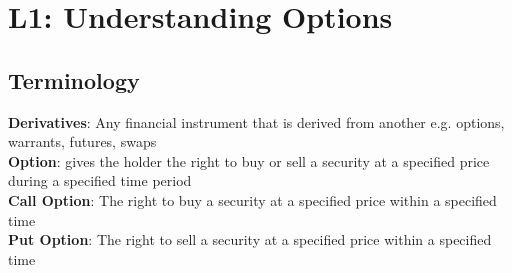 \documentclass{cheatsheet}
\author{ehaller, seyohnp}
\begin{document}
    \section*{L1: Understanding Options}
    \subsection*{Terminology}
        \textbf{Derivatives}: Any financial instrument that is derived from another e.g. options, warrants, futures, swaps\\
        \textbf{Option}: gives the holder the right to buy or sell a security at a specified price during a specified time period\\
        \textbf{Call Option}: The right to buy a security at a specified price within a specified time\\
        \textbf{Put Option}: The right to sell a security at a specified price within a specified time\\
\end{document}
